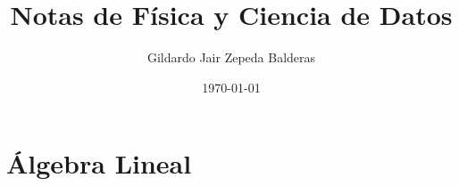 \documentclass[12pt, a4paper]{report}
\title{Notas de Física y Ciencia de Datos}
\author{Gildardo Jair Zepeda Balderas}
\date{\today}
\begin{document}
	
	
	\tableofcontents
	\newpage
	
	\part{Álgebra Lineal}
	
	
	
	
\end{document}
